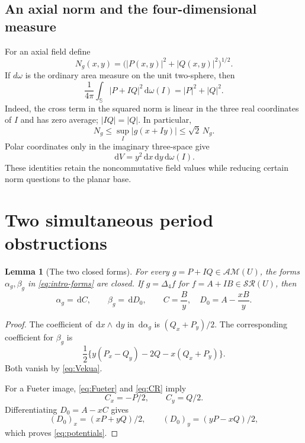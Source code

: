 \documentclass[11pt,a4paper]{article}
\numberwithin{equation}{section}
\newtheorem{lemma}[theorem]{Lemma}
\theoremstyle{definition}
\theoremstyle{remark}
\newcommand{\SSS}{\mathbb S}
\newcommand{\SR}{\mathcal{SR}}
\newcommand{\AM}{\mathcal{AM}}
\newcommand{\lap}{\Delta_4}
\newcommand{\dd}{\,\mathrm d}
\begin{document}
\subsection{An axial norm and the four-dimensional measure}
For an axial field define
\[
 N_g(x,y)=\bigl(|P(x,y)|^2+|Q(x,y)|^2\bigr)^{1/2}.
\]
If $d\omega$ is the ordinary area measure on the unit two-sphere, then
\begin{equation}\label{eq:sphere-average}
 \frac1{4\pi}\int_{\SSS}|P+IQ|^2\dd\omega(I)=|P|^2+|Q|^2.
\end{equation}
Indeed, the cross term in the squared norm is linear in the three real
coordinates of $I$ and has zero average; $|IQ|=|Q|$. In particular,
\begin{equation}\label{eq:norm-equiv}
 N_g\le\sup_I|g(x+Iy)|\le\sqrt2\,N_g.
\end{equation}
Polar coordinates only in the imaginary three-space give
\begin{equation}\label{eq:measure}
 \dd V=y^2\dd x\dd y\dd\omega(I).
\end{equation}
These identities retain the noncommutative field values while reducing
certain norm questions to the planar base.

\section{Two simultaneous period obstructions}
\label{sec:periods}

\begin{lemma}[The two closed forms]\label{lem:closed}
For every $g=P+IQ\in\AM(U)$, the forms $\alpha_g,\beta_g$ in
\eqref{eq:intro-forms} are closed. If $g=\lap f$ for $f=A+IB\in\SR(U)$,
then
\begin{equation}\label{eq:potentials}
 \alpha_g=\dd C,\qquad \beta_g=\dd D_0,
 \qquad C=\frac By,\quad D_0=A-\frac{xB}{y}.
\end{equation}
\end{lemma}
\begin{proof}
The coefficient of $\dd x\wedge\dd y$ in $\dd\alpha_g$ is
$(Q_x+P_y)/2$. The corresponding coefficient for $\beta_g$ is
\[
 \frac12\{y(P_x-Q_y)-2Q-x(Q_x+P_y)\}.
\]
Both vanish by \eqref{eq:Vekua}.

For a Fueter image, \eqref{eq:Fueter} and \eqref{eq:CR} imply
\[
 C_x=-P/2,\qquad C_y=Q/2.
\]
Differentiating $D_0=A-xC$ gives
\[
 (D_0)_x=(xP+yQ)/2,\qquad (D_0)_y=(yP-xQ)/2,
\]
which proves \eqref{eq:potentials}.
\end{proof}
\end{document}
